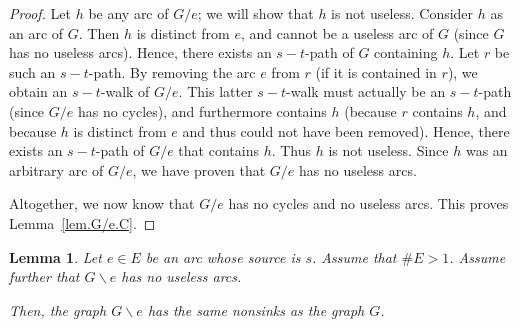 \documentclass[12pt]{amsart}
\newtheorem{lemma}[theorem]{Lemma}
\theoremstyle{definition}
\begin{document}
\begin{proof}
Let $h$ be any arc of $G / e$; we will show that $h$ is not useless.  
Consider $h$ as an arc of $G$.
Then $h$ is distinct from $e$, and cannot be a useless arc of $G$ (since $G$ has no useless arcs).
Hence, there exists an $s-t$-path of $G$ containing $h$.
Let $r$ be such an $s-t$-path.
By removing the arc $e$ from $r$ (if it is contained in $r$),
we obtain an $s-t$-walk of $G / e$.
This latter $s-t$-walk must actually be an $s-t$-path (since $G / e$
has no cycles), and furthermore contains $h$ (because $r$ contains
$h$, and because $h$ is distinct from $e$ and thus could not
have been removed).
Hence, there exists an $s-t$-path of $G / e$ that contains $h$.
Thus $h$ is not useless.
Since $h$ was an arbitrary arc of $G / e$, we have proven that $G / e$ has no useless arcs.

Altogether, we now know that $G / e$ has no cycles and no useless arcs.
This proves Lemma~\ref{lem.G/e.C}.
\end{proof}

\begin{lemma} \label{lem.G/e.Dnew}
    Let $e \in E$ be an arc whose source is $s$.
	Assume that $\# E > 1$.
    Assume further that $G \backslash e$ has no useless arcs.
    
    
    Then, the graph $G \backslash e$ has the same nonsinks as the graph $G$.
    
    
\end{lemma}
\end{document}

